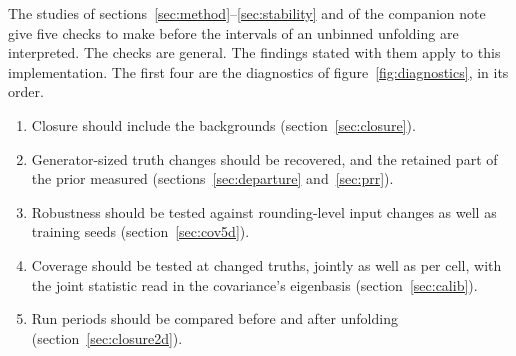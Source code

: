The studies of sections~\ref{sec:method}--\ref{sec:stability} and of the companion note give five checks to make before the intervals of an unbinned unfolding are interpreted. The checks are general. The findings stated with them apply to this implementation. The first four are the diagnostics of figure~\ref{fig:diagnostics}, in its order.
\begin{enumerate}
\item Closure should include the backgrounds (section~\ref{sec:closure}).
\item Generator-sized truth changes should be recovered, and the retained part of the prior measured (sections~\ref{sec:departure} and~\ref{sec:prr}).
\item Robustness should be tested against rounding-level input changes as well as training seeds (section~\ref{sec:cov5d}).
\item Coverage should be tested at changed truths, jointly as well as per cell, with the joint statistic read in the covariance's eigenbasis (section~\ref{sec:calib}).
\item Run periods should be compared before and after unfolding (section~\ref{sec:closure2d}).
\end{enumerate}


